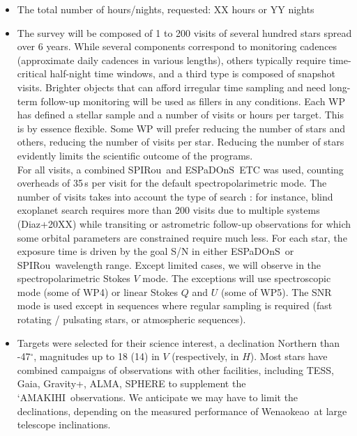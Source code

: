 \documentclass[
    traditabstract,
    longauth,
    onecolumn,
]{aa}
\def \amakihi{`AMAKIHI}
\def \spi{SPIRou}
\def \esp{ESPaDOnS}
\def \wena{Wenaokeao}
\begin{document}
\begin{itemize}
    \item 
The total number of hours/nights, requested: XX hours or YY nights
    \item 
The survey will be composed of 1 to 200 visits of several hundred stars spread over 6 years. While several components correspond to monitoring cadences (approximate daily cadences in various lengths), others typically require time-critical half-night time windows, and a third type is composed of snapshot visits. Brighter objects that can afford irregular time sampling and need long-term follow-up monitoring will be used as fillers in any conditions.
Each WP has defined a stellar sample and a number of visits or hours per target. This is by essence flexible. Some WP will prefer reducing the number of stars and others, reducing the number of visits per star. Reducing the number of stars evidently limits the scientific outcome of the programs. \\
For all visits, a combined \spi\ and \esp\ ETC was used, counting overheads of 35\,s per visit for the default spectropolarimetric mode. The number of visits takes into account the type of search : for instance, blind exoplanet search requires more than 200 visits due to multiple systems (Diaz+20XX) while transiting or astrometric follow-up observations for which some orbital parameters are constrained require much less. For each star, the exposure time is driven by the goal S/N in either \esp\ or \spi\ wavelength range. Except limited cases, we will observe in the spectropolarimetric Stokes $V$ mode. The exceptions will use spectroscopic mode (some of WP4) or linear Stokes $Q$ and $U$ (some of WP5). The SNR mode is used except in sequences where regular sampling is required (fast rotating / pulsating stars, or atmospheric sequences).
    \item 
Targets were selected for their science interest, a declination Northern than -47$^{\circ}$, magnitudes up to 18 (14) in $V$ (respectively, in $H$). Most stars have combined campaigns of observations with other facilities, including TESS, Gaia, Gravity+, ALMA, SPHERE to supplement the \amakihi\ observations. We anticipate we may have to limit the declinations, depending on the measured performance of \wena\ at large telescope inclinations.

\end{itemize}
\end{document}
